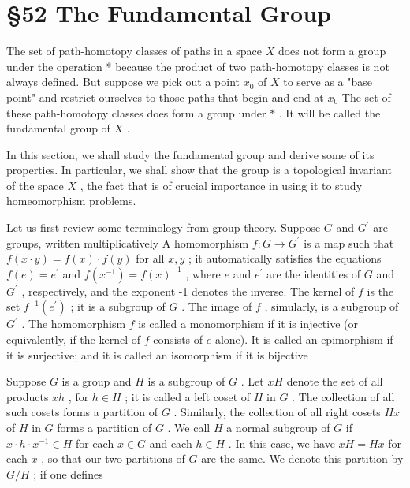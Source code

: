 \documentclass[10pt]{article}
\begin{document}
\section*{§52 The Fundamental Group}

The set of path-homotopy classes of paths in a space \(X\) does not form a group under the operation * because the product of two path-homotopy classes is not always defined. But suppose we pick out a point \({x}_{0}\) of \(X\) to serve as a "base point" and restrict ourselves to those paths that begin and end at \({x}_{0}\) The set of these path-homotopy classes does form a group under \(*\) . It will be called the fundamental group of \(X\) .

In this section, we shall study the fundamental group and derive some of its properties. In particular, we shall show that the group is a topological invariant of the space \(X\) , the fact that is of crucial importance in using it to study homeomorphism problems.

Let us first review some terminology from group theory. Suppose \(G\) and \({G}^{\prime }\) are groups, written multiplicatively A homomorphism \(f : G \rightarrow  {G}^{\prime }\) is a map such that \(f\left( {x \cdot  y}\right)  = f\left( x\right)  \cdot  f\left( y\right)\) for all \(x,y\) ; it automatically satisfies the equations \(f\left( e\right)  = {e}^{\prime }\) and \(f\left( {x}^{-1}\right)  = f{\left( x\right) }^{-1}\) , where \(e\) and \({e}^{\prime }\) are the identities of \(G\) and \({G}^{\prime }\) , respectively, and the exponent -1 denotes the inverse. The kernel of \(f\) is the set \({f}^{-1}\left( {e}^{\prime }\right)\) ; it is a subgroup of \(G\) . The image of \(f\) , simularly, is a subgroup of \({G}^{\prime }\) . The homomorphism \(f\) is called a monomorphism if it is injective (or equivalently, if the kernel of \(f\) consists of \(e\) alone). It is called an epimorphism if it is surjective; and it is called an isomorphism if it is bijective

Suppose \(G\) is a group and \(H\) is a subgroup of \(G\) . Let \({xH}\) denote the set of all products \({xh}\) , for \(h \in  H\) ; it is called a left coset of \(H\) in \(G\) . The collection of all such cosets forms a partition of \(G\) . Similarly, the collection of all right cosets \({Hx}\) of \(H\) in \(G\) forms a partition of \(G\) . We call \(H\) a normal subgroup of \(G\) if \(x \cdot  h \cdot  {x}^{-1} \in  H\) for each \(x \in  G\) and each \(h \in  H\) . In this case, we have \({xH} = {Hx}\) for each \(x\) , so that our two partitions of \(G\) are the same. We denote this partition by \(G/H\) ; if one defines
\end{document}
